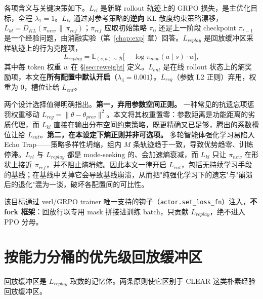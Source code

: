 各项含义与关键决策如下。$L_{rl}$ 是新鲜 rollout 轨迹上的 GRPO 损失，是主优化目标，全程 $\lambda_1=1$。$L_{kl}$ 通过对参考策略的\textbf{逆向} KL 散度约束策略漂移，$L_{kl}=D_{KL}(\pi_{new}\,\|\,\pi_{ref})$；$\pi_{ref}$ 应取初始策略 $\pi_0$ 还是上一阶段 checkpoint $\pi_{t-1}$ 是一个经验问题，由消融实验（第~\ref{chap:exp} 章）回答。$L_{replay}$ 是回放缓冲区采样轨迹上的行为克隆项，
\begin{equation}
\label{eq:lreplay}
L_{replay} = \mathbb{E}_{(s,a)\sim \mathcal{B}}\big[-\log \pi_{new}(a\mid s)\cdot w\big],
\end{equation}
其中每 token 权重 $w$ 在 \S\ref{sec:reweight} 定义。$L_{ent}$ 是在线 rollout 状态上的熵奖励项，本文在\textbf{所有配置中默认开启}（$\lambda_4=0.001$）。$L_{reg}$（参数 L2 正则）弃用，权重为 0，槽位让给 $L_{ent}$。

两个设计选择值得明确指出。\textbf{第一，弃用参数空间正则。} 一种常见的抗遗忘项惩罚权重移动 $L_{reg}=\|\theta-\theta_{prev}\|^2$。本文将其权重置零：参数距离是功能距离的劣质代理，而 $L_{kl}$ 直接在输出分布空间约束策略，既更精确又已足够，腾出的系数槽位让给 $L_{ent}$。\textbf{第二，在本设定下熵正则并非可选项。} 多轮智能体强化学习易陷入 Echo Trap——策略多样性坍缩，组内 $M$ 条轨迹趋于一致，导致优势趋零、训练停滞。$L_{rl}$ 与 $L_{replay}$ 都是 mode-seeking 的、会加速熵衰减，而 $L_{kl}$ 只让 $\pi_{new}$ 在形状上接近 $\pi_{ref}$，并不阻止熵坍缩。因此本文一律开启 $L_{ent}$，包括无持续学习手段的基线；在基线中关掉它会导致基线崩溃，从而把"纯强化学习下的遗忘"与"崩溃后的退化"混为一谈，破坏各配置间的可比性。

该目标通过 verl/GRPO trainer 唯一支持的钩子（\texttt{actor.set\_loss\_fn}）注入，\textbf{不 fork 框架}：回放行以专用 mask 拼接进训练 batch，只贡献 $L_{replay}$，绝不进入 PPO 分母。

\section{按能力分桶的优先级回放缓冲区}
\label{sec:buffer}

回放缓冲区是 $L_{replay}$ 取数的记忆体。两条原则使它区别于 CLEAR 这类朴素经验回放缓冲区。

